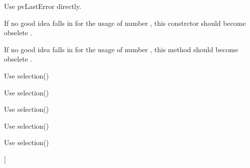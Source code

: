 
\begin{DoxyRefList}
\item[\label{deprecated__deprecated000012}%
\hypertarget{deprecated__deprecated000012}{}%
Member \hyperlink{classmdt_device_a6e7133e8665d9113d9423f4db44b1000}{mdt\-Device\-:\-:last\-Error\-W} ()]Use pv\-Last\-Error directly.  
\item[\label{deprecated__deprecated000013}%
\hypertarget{deprecated__deprecated000013}{}%
Member \hyperlink{classmdt_error_a377c175cc8e1aeae543cae2ecc5ca87b}{mdt\-Error\-:\-:mdt\-Error} (int number, const Q\-String \&text, level\-\_\-t level)]If no good idea falls in for the usage of number , this constrctor should become obselete .  
\item[\label{deprecated__deprecated000014}%
\hypertarget{deprecated__deprecated000014}{}%
Member \hyperlink{classmdt_error_ad233adb8efe4180b85f584c5afdd49fc}{mdt\-Error\-:\-:number} () const ]If no good idea falls in for the usage of number , this method should become obselete .  
\item[\label{deprecated__deprecated000003}%
\hypertarget{deprecated__deprecated000003}{}%
Member \hyperlink{classmdt_sql_selection_dialog_ae5582bd717078a137dd71d5a1b9cc9f9}{mdt\-Sql\-Selection\-Dialog\-:\-:add\-Selection\-Result\-Column} (const Q\-String \&field)]Use selection()  
\item[\label{deprecated__deprecated000007}%
\hypertarget{deprecated__deprecated000007}{}%
Member \hyperlink{classmdt_sql_selection_dialog_aab4943bc01e64f867791c15eea613e23}{mdt\-Sql\-Selection\-Dialog\-:\-:selected\-Data} (int row, const Q\-String \&field\-Name)]Use selection()  
\item[\label{deprecated__deprecated000004}%
\hypertarget{deprecated__deprecated000004}{}%
Member \hyperlink{classmdt_sql_selection_dialog_affdf9a9936509c8b6ca141b8ff415995}{mdt\-Sql\-Selection\-Dialog\-:\-:selected\-Data\-Record} ()]Use selection()  
\item[\label{deprecated__deprecated000005}%
\hypertarget{deprecated__deprecated000005}{}%
Member \hyperlink{classmdt_sql_selection_dialog_a23592c799f3b8945b3f5e72082dc265b}{mdt\-Sql\-Selection\-Dialog\-:\-:selection\-Result} ()]Use selection()  
\item[\label{deprecated__deprecated000006}%
\hypertarget{deprecated__deprecated000006}{}%
Member \hyperlink{classmdt_sql_selection_dialog_a85b7c1e3e156c141315d0873fa36d4b3}{mdt\-Sql\-Selection\-Dialog\-:\-:selection\-Results} ()]Use selection()  
\item[\label{deprecated__deprecated000001}%

\end{DoxyRefList}
